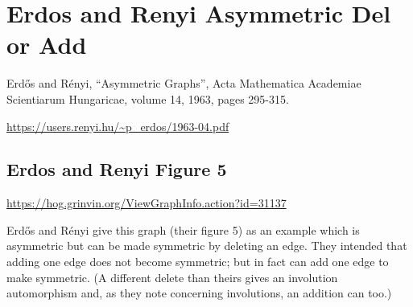 \documentclass{article}
\begin{document}
\begin{center}
\end{center}


\clearpage
\section{Erdos and Renyi Asymmetric Del or Add}

Erd\H{o}s and R\'enyi, ``Asymmetric Graphs'', Acta Mathematica
Academiae Scientiarum Hungaricae, volume 14, 1963, pages 295-315.

\url{https://users.renyi.hu/~p_erdos/1963-04.pdf}

\subsection{Erdos and Renyi Figure 5}

\url{https://hog.grinvin.org/ViewGraphInfo.action?id=31137}

\smallskip

Erd\H{o}s and R\'enyi give this graph (their figure 5) as an example
which is asymmetric but can be made symmetric by deleting an edge.
They intended that adding one edge does not become symmetric; but in
fact can add one edge to make symmetric.  (A different delete than
theirs gives an involution automorphism and, as they note concerning
involutions, an addition can too.)
\end{document}
